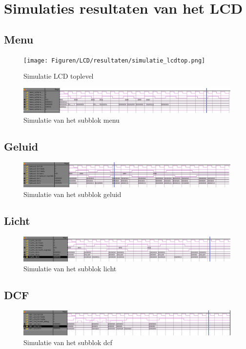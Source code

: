 \chapter[Simulatie resultaten LCD]{Simulaties resultaten van het LCD}
\label{Ap:sim_LCD}
\section{Menu}
\begin{figure}[h!]
\texttt{[image: Figuren/LCD/resultaten/simulatie\_lcdtop.png]}
\caption{Simulatie LCD toplevel}
\label{fig:sim_lcdtop}
\end{figure}

\begin{figure}[h!]
\includegraphics[width=\textwidth,height=\textheight,keepaspectratio]{Figuren/LCD/resultaten/menu.jpg}
\caption{Simulatie van het subblok menu}
\label{fig:simmenu}
\end{figure}
\section{Geluid}
\begin{figure}[h!]
\includegraphics[width=\textwidth,height=\textheight,keepaspectratio]{Figuren/LCD/resultaten/geluid.jpg}
\caption{Simulatie van het subblok geluid}
\label{fig:simgeluid}
\end{figure}
\section{Licht}
\begin{figure}[h!]
\includegraphics[width=\textwidth,height=\textheight,keepaspectratio]{Figuren/LCD/resultaten/licht.jpg}
\caption{Simulatie van het subblok licht}
\label{fig:simlicht}
\end{figure}
\section{DCF}
\begin{figure}[h!]
\includegraphics[width=\textwidth,height=\textheight,keepaspectratio]{Figuren/LCD/resultaten/dcf.jpg}
\caption{Simulatie van het subblok dcf}
\label{fig:simdcf}
\end{figure}


